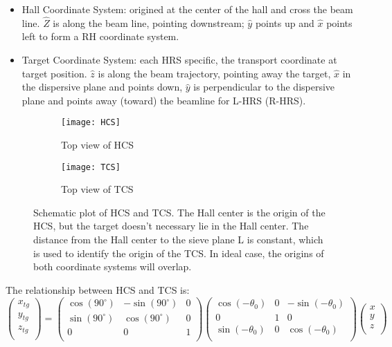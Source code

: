 \begin{itemize}
    \item Hall Coordinate System: origined at the center of the hall and
	cross the beam line.  $\hat{Z}$ is along the beam line, pointing downstream; 
	$\hat{y}$ points up and $\hat{x}$ points left to form a RH coordinate system.
    \item Target Coordinate System: each HRS specific, the transport coordinate at target position.
	$\hat{z}$ is along the beam trajectory, pointing away the target, 
	$\hat{x}$ in the dispersive plane and points down, $\hat{y}$ is perpendicular
	to the dispersive plane and points away (toward) the beamline for L-HRS (R-HRS).
\end{itemize}

\begin{figure}[H]
    \begin{subfigure}[b]{0.5\textwidth}
	\texttt{[image: HCS]}
	\caption{Top view of HCS}
    \end{subfigure}
    \begin{subfigure}[b]{0.5\textwidth}
	\texttt{[image: TCS]}
	\caption{Top view of TCS}
    \end{subfigure}
    \caption{Schematic plot of HCS and TCS. The Hall center is the origin of the 
    HCS, but the target doesn't necessary lie in the Hall center. The distance
    from the Hall center to the sieve plane L is constant, which is used to
    identify the origin of the TCS. In ideal case, the origins of both coordinate
    systems will overlap.}
\end{figure}

The relationship between HCS and TCS is:
\begin{equation}
    \begin{pmatrix}
	x_{tg}	\\
	y_{tg}	\\
	z_{tg}	\\
    \end{pmatrix}
    =
    \begin{pmatrix}
	\cos(90^\circ)   & -\sin(90^\circ)    & 0	\\
	\sin(90^\circ)   & \cos(90^\circ)     & 0	\\
	0   & 0     & 1	\\
    \end{pmatrix}
    \begin{pmatrix}
	\cos(-\theta_0)	& 0 & -\sin(-\theta_0)  \\
	0		& 1 & 0		\\
	\sin(-\theta_0)	& 0 & \cos(-\theta_0)  \\
    \end{pmatrix}
    \begin{pmatrix}
	x   \\
	y   \\
	z   \\
    \end{pmatrix}
\end{equation}

